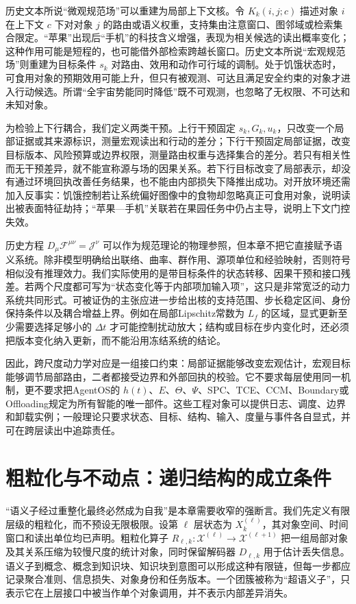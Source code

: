 历史文本所说“微观规范场”可以重建为局部上下文核。令 $K_k(i,j;c)$ 描述对象 $i$ 在上下文 $c$ 下对对象 $j$ 的路由或语义权重，支持集由注意窗口、图邻域或检索集合限定。“苹果”出现后“手机”的科技含义增强，表现为相关候选的读出概率变化；这种作用可能是短程的，也可能借外部检索跨越长窗口。历史文本所说“宏观规范场”则重建为目标条件 $s_k$ 对路由、效用和动作可行域的调制。处于饥饿状态时，可食用对象的预期效用可能上升，但只有被观测、可达且满足安全约束的对象才进入行动候选。所谓“全宇宙势能同时降低”既不可观测，也忽略了无权限、不可达和未知对象。

为检验上下行耦合，我们定义两类干预。上行干预固定 $s_k,G_k,u_k$，只改变一个局部证据或其来源标识，测量宏观读出和行动的差分；下行干预固定局部证据，改变目标版本、风险预算或边界权限，测量路由权重与选择集合的差分。若只有相关性而无干预差异，就不能宣称源与场的因果关系。若下行目标改变了局部表示，却没有通过环境回执改善任务结果，也不能由内部损失下降推出成功。对开放环境还需加入反事实：饥饿控制若让系统偏好图像中的食物却忽略真正可食用对象，说明读出被表面特征劫持；“苹果—手机”关联若在果园任务中仍占主导，说明上下文门控失效。

历史方程 $D_\mu\mathcal F^{\mu\nu}=\mathcal J^\nu$ 可以作为规范理论的物理参照，但本章不把它直接赋予语义系统。除非模型明确给出联络、曲率、群作用、源项单位和经验映射，否则符号相似没有推理效力。我们实际使用的是带目标条件的状态转移、因果干预和接口残差。若两个尺度都可写为“状态变化等于内部项加输入项”，这只是非常宽泛的动力系统共同形式。可被证伪的主张应进一步给出核的支持范围、步长稳定区间、身份保持条件以及耦合增益上界。例如在局部Lipschitz常数为 $L_f$ 的区域，显式更新至少需要选择足够小的 $\Delta t$ 才可能控制扰动放大；结构或目标在步内变化时，还必须把版本变化纳入更新，而不能沿用冻结系统的结论。

因此，跨尺度动力学对应是一组接口约束：局部证据能够改变宏观估计，宏观目标能够调节局部路由，二者都接受边界和外部回执的校验。它不要求每层使用同一机制，更不要求把AgentOS的 $h(t)$、$E$、$\Theta$、$\Psi$、SPC、TCE、CCM、Boundary或Offloading规定为所有智能的唯一部件。这些工程对象可以提供日志、调度、边界和卸载实例；一般理论只要求状态、目标、结构、输入、度量与事件各自显式，并可在跨层读出中追踪责任。

\section{粗粒化与不动点：递归结构的成立条件}
\label{sec:section_8045}
“语义子经过重整化最终必然成为自我”是本章需要收窄的强断言。我们先定义有限层级的粗粒化，而不预设无限极限。设第 $\ell$ 层状态为 $X_k^{(\ell)}$，其对象空间、时间窗口和读出单位均已声明。粗粒化算子 $R_{\ell,k}:\mathcal X^{(\ell)}\rightarrow\mathcal X^{(\ell+1)}$ 把一组局部对象及其关系压缩为较慢尺度的统计对象，同时保留解码器 $D_{\ell,k}$ 用于估计丢失信息。语义子到概念、概念到知识块、知识块到意图可以形成这种有限链，但每一步都应记录聚合准则、信息损失、对象身份和任务版本。一个团簇被称为“超语义子”，只表示它在上层接口中被当作单个对象调用，并不表示内部差异消失。

